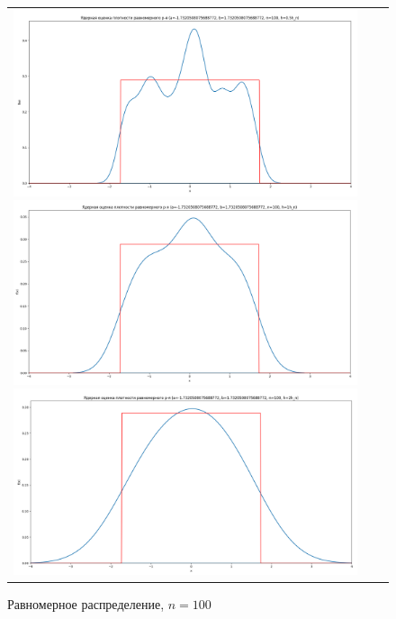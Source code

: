 \begin{figure}[H]
	\begin{tabular}{ccc}
		\includegraphics[scale=0.14]{resources/4_uniform_100_half.png}
		\includegraphics[scale=0.14]{resources/4_uniform_100_one.png}
		\includegraphics[scale=0.14]{resources/4_uniform_100_two.png}
	\end{tabular}
	\caption{Равномерное распределение, $n=100$}
\end{figure}

\newpage

